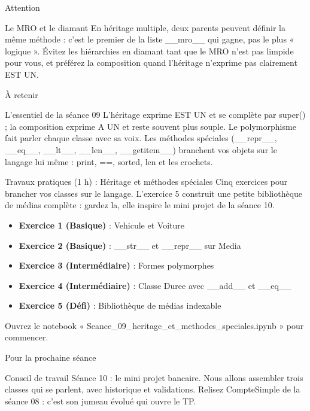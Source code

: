 \documentclass[aspectratio=169,11pt]{beamer}
\begin{document}
\begin{frame}{Attention}
\begin{alertblock}{Le MRO et le diamant}
En héritage multiple, deux parents peuvent définir la même méthode : c'est le premier de la liste \_\_mro\_\_ qui gagne, pas le plus « logique ». Évitez les hiérarchies en diamant tant que le MRO n'est pas limpide pour vous, et préférez la composition quand l'héritage n'exprime pas clairement EST UN.
\end{alertblock}
\end{frame}

\begin{frame}{À retenir}
\begin{block}{L'essentiel de la séance 09}
L'héritage exprime EST UN et se complète par super() ; la composition exprime A UN et reste souvent plus souple. Le polymorphisme fait parler chaque classe avec sa voix. Les méthodes spéciales (\_\_repr\_\_, \_\_eq\_\_, \_\_lt\_\_, \_\_len\_\_, \_\_getitem\_\_) branchent vos objets sur le langage lui même : print, ==, sorted, len et les crochets.
\end{block}
\end{frame}

\begin{frame}{Travaux pratiques (1 h) : Héritage et méthodes spéciales}
Cinq exercices pour brancher vos classes sur le langage. L'exercice 5 construit une petite bibliothèque de médias complète : gardez la, elle inspire le mini projet de la séance 10.

\begin{itemize}
  \setlength{\itemsep}{1.5pt}\setlength{\parskip}{0pt}
  \item \textbf{Exercice 1 (Basique)} : Vehicule et Voiture
  \item \textbf{Exercice 2 (Basique)} : \_\_str\_\_ et \_\_repr\_\_ sur Media
  \item \textbf{Exercice 3 (Intermédiaire)} : Formes polymorphes
  \item \textbf{Exercice 4 (Intermédiaire)} : Classe Duree avec \_\_add\_\_ et \_\_eq\_\_
  \item \textbf{Exercice 5 (Défi)} : Bibliothèque de médias indexable
\end{itemize}
\vspace{4pt}

{\small\color{PyGris}Ouvrez le notebook « Seance\_09\_heritage\_et\_methodes\_speciales.ipynb » pour commencer.}
\end{frame}
\begin{frame}{Pour la prochaine séance}
\begin{exampleblock}{Conseil de travail}
Séance 10 : le mini projet bancaire. Nous allons assembler trois classes qui se parlent, avec historique et validations. Relisez CompteSimple de la séance 08 : c'est son jumeau évolué qui ouvre le TP.
\end{exampleblock}
\end{frame}
\end{document}
